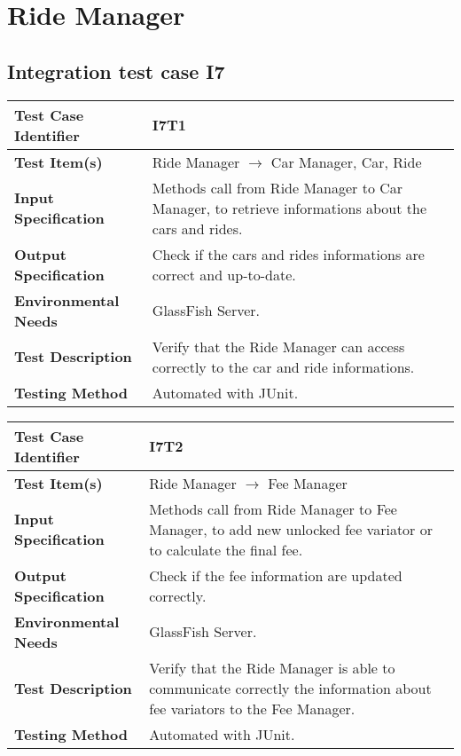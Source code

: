 \section{Ride Manager}
\subsection{Integration test case I7}

\begin{tabular}{l p{}}
    \hline
    \textbf{Test Case Identifier} & I7T1\\
    \hline
    \textbf{Test Item(s)} & Ride Manager $\rightarrow$ Car Manager, Car, Ride\\
    \hline
    \textbf{Input Specification} & Methods call from Ride Manager to Car Manager, to retrieve informations about the cars and rides.\\
    \hline
    \textbf{Output Specification} & Check if the cars and rides informations are correct and up-to-date.\\
    \hline
    \textbf{Environmental Needs} & GlassFish Server. \\
    \hline
    \textbf{Test Description} & Verify that the Ride Manager can access correctly to the car and ride informations.\\
    \hline
    \textbf{Testing Method} & Automated with JUnit.\\
    \hline
\end{tabular}


\vspace{2em}

\noindent\begin{tabular}{l p{}}
    \hline
    \textbf{Test Case Identifier} & I7T2\\
    \hline
    \textbf{Test Item(s)} & Ride Manager $\rightarrow$ Fee Manager\\
    \hline
    \textbf{Input Specification} & Methods call from Ride Manager to Fee Manager, to add new unlocked fee variator or to calculate the final fee.\\
    \hline
    \textbf{Output Specification} & Check if the fee information are updated correctly.\\
    \hline
    \textbf{Environmental Needs} & GlassFish Server. \\
    \hline
    \textbf{Test Description} & Verify that the Ride Manager is able to communicate correctly the information about fee variators to the Fee Manager.\\
    \hline
    \textbf{Testing Method} & Automated with JUnit.\\
    \hline
\end{tabular}